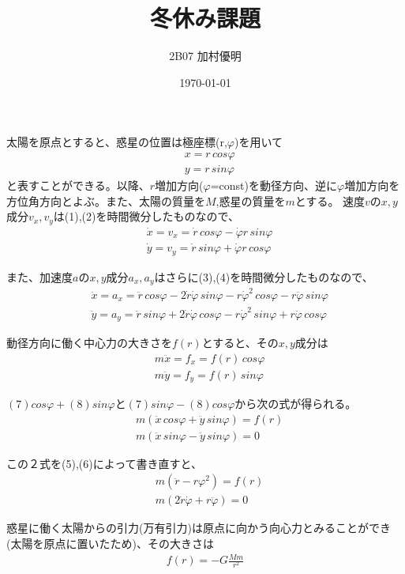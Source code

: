 \documentclass{jsarticle}
\title{冬休み課題}
\date{\today}
\author{2B07 加村優明}
\begin{document}
\maketitle

太陽を原点とすると、惑星の位置は極座標(r,$\varphi$)を用いて
 \begin{align}
    &x=r\,cos\varphi \\
    &y=r\,sin\varphi
 \end{align}
と表すことができる。以降、$r$増加方向($\varphi$=const)を動径方向、逆に$\varphi$増加方向を方位角方向とよぶ。また、太陽の質量を$M$,惑星の質量を$m$とする。
速度$v$の$x,y$成分$v_x,v_y$は(1),(2)を時間微分したものなので、
  \begin{align}
  &\dot{x}=v_x=\dot{r}\,cos\varphi-\dot{\varphi}r\,sin\varphi \\
  &\dot{y}=v_y=\dot{r}\,sin\varphi+\dot{\varphi}r\,cos\varphi
  \end{align}

また、加速度$a$の$x,y$成分$a_x,a_y$はさらに(3),(4)を時間微分したものなので、
  \begin{align}
    &\ddot{x}=a_x=\ddot{r}\,cos\varphi-2\dot{r}\dot{\varphi}\,sin\varphi-r\dot{\varphi}^2\,cos\varphi-r\ddot{\varphi}\,sin\varphi \\
    &\ddot{y}=a_y=\ddot{r}\,sin\varphi+2\dot{r}\dot{\varphi}\,cos\varphi-r\dot{\varphi}^2\,sin\varphi+r\ddot{\varphi}\,cos\varphi
  \end{align}

動径方向に働く中心力の大きさを$f(r)$とすると、その$x,y$成分は
  \begin{align}
    &m\ddot{x}=f_x=f(r)\,cos\varphi\\
    &m\ddot{y}=f_y=f(r)\,sin\varphi
  \end{align}
    
$(7)cos\varphi+(8)sin\varphi$と$(7)sin\varphi-(8)cos\varphi$から次の式が得られる。
  \begin{align}
  &m(\ddot{x}\,cos\varphi+\ddot{y}\,sin\varphi)=f(r)\\
  &m(\ddot{x}\,sin\varphi-\ddot{y}\,sin\varphi)=0
  \end{align}

この２式を(5),(6)によって書き直すと、
  \begin{align}
    &m(\ddot{r}-r\varphi^2)=f(r) \\
    &m(2\dot{r}\dot{\varphi}+r\ddot{\varphi})=0
  \end{align}

惑星に働く太陽からの引力(万有引力)は原点に向かう向心力とみることができ(太陽を原点に置いたため)、その大きさは
  \begin{align}
    f(r)=-G\frac{Mm}{r^2}
  \end{align}
\end{document}
